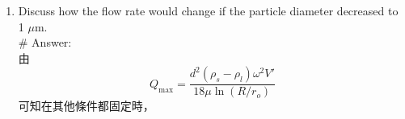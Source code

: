 ﻿\documentclass[12pt,a4paper]{article}
\begin{document}
\begin{problems}
\begin{enumerate}
\begin{equation}
    \frac{\pi}{6}d^3(\rho_s-\rho_l)r\omega^2 = 3\pi\mu d\,\frac{dr}{dt} \implies
    \frac{dr}{dt} = \frac{d^2(\rho_s-\rho_l)}{18\mu}\,r\omega^2
  \end{equation}
  retention time為
  \begin{equation}
    t_R = \frac{18\mu}{d^2(\rho_s-\rho_l)\omega^2}\ln\left(\frac{R}{r_o}\right)
  \end{equation}
  先檢查可否使用 $h\ll R$ 的近似：
  \begin{equation}
    \frac{h}{R} = \frac{0.05}{0.15} = \frac{1}{3}
  \end{equation}
  因此$h$沒有遠小於$R$，使用精確形式，centrifuge 內液體體積為
  \begin{equation}
    V' = \pi(R^2-r_o^2)H
  \end{equation}
  代入數值
  \begin{equation}
    V' = \pi(0.15^2-0.10^2)(0.75) = 2.945\times 10^{-2}~\text{m}^3
  \end{equation}
  對於 maximum throughput
  \begin{equation}
    \frac{V'}{Q_{\max}} = t_R
  \end{equation}
  也就是
  \begin{equation}
    Q_{\max} = \frac{V'}{t_R}
    = \frac{d^2(\rho_s-\rho_l)\omega^2V'}{18\mu\ln(R/r_o)}
  \end{equation}
  代入數值：
  \begin{equation}
    Q_{\max}
    = \frac{(5\times 10^{-6})^2(1600)(1884.96)^2(2.945\times 10^{-2})}{18(0.0011)\ln(0.15/0.10)}
    = 5.213518\times 10^{-1}~\text{m}^3/\text{s}
  \end{equation}
  換算為每小時流量：
  \begin{equation}
    Q_{\max} = 0.5213518\times 3600 = 1.87687\times 10^3~\text{m}^3/\text{h}
  \end{equation}
  答案為
  \begin{equation}
    \underline{Q_{\max} = 5.213518\times 10^{-1}~\text{m}^3/\text{s} \approx 1.1.87687\times 10^3~\text{m}^3/\text{h}}
  \end{equation}
  \item Discuss how the flow rate would change if the particle diameter decreased to 1 $\mu$m.
  \\
  \# Answer:\\
  由
  \begin{equation}
    Q_{\max} = \frac{d^2(\rho_s-\rho_l)\omega^2V'}{18\mu\ln(R/r_o)}
  \end{equation}
  可知在其他條件都固定時，
  \begin{equation}

\end{equation}
\end{enumerate}
\end{problems}
\end{document}
